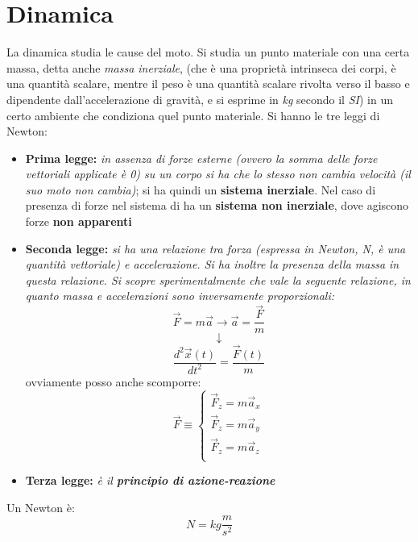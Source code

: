 \documentclass[a4paper,12pt, oneside]{book}
\begin{document}

\newpage
\section{Dinamica}
La dinamica studia le cause del moto. Si studia un punto materiale con una certa massa, detta anche \textit{massa inerziale}, (che è una proprietà intrinseca dei corpi, è una quantità scalare, mentre il peso è una quantità scalare rivolta verso il basso e dipendente dall'accelerazione di gravità, e si esprime in \textit{kg} secondo il \textit{SI}) in un certo ambiente che condiziona quel punto materiale. Si hanno le tre leggi di Newton:
\begin{itemize}
	\item \textbf{Prima legge:} \textit{in assenza di forze esterne (ovvero la somma delle forze vettoriali applicate è 0) su un corpo si ha che lo stesso non cambia velocità (il suo moto non cambia)}; si ha quindi un \textbf{sistema inerziale}. Nel caso di presenza di forze nel sistema di ha un \textbf{sistema non inerziale}, dove agiscono forze \textbf{non apparenti}
	\item \textbf{Seconda legge:} \textit{si ha una relazione tra forza (espressa in Newton, N, è una quantità vettoriale) e accelerazione. Si ha inoltre la presenza della massa in questa relazione. Si scopre sperimentalmente che vale la seguente relazione, in quanto massa e accelerazioni sono inversamente proporzionali:}
	      $$\vec{F}=m\vec{a}\to \vec{a}=\frac{\vec{F}}{m}$$
	      $$\downarrow$$
	      $$\frac{d^2\vec{x}(t)}{dt^2}=\frac{\vec{F}(t)}{m}$$
	      ovviamente posso anche scomporre:
	      $$\vec{F}\equiv
		      \begin{cases}
			      \vec{F}_z=m\vec{a}_x \\
			      \vec{F}_z=m\vec{a}_y \\
			      \vec{F}_z=m\vec{a}_z \\
		      \end{cases}$$
	\item \textbf{Terza legge:} \textit{è il \textbf{principio di azione-reazione}}
\end{itemize}
Un Newton è:
$$N=kg\frac{m}{s^2}$$
\newpage
\end{document}
